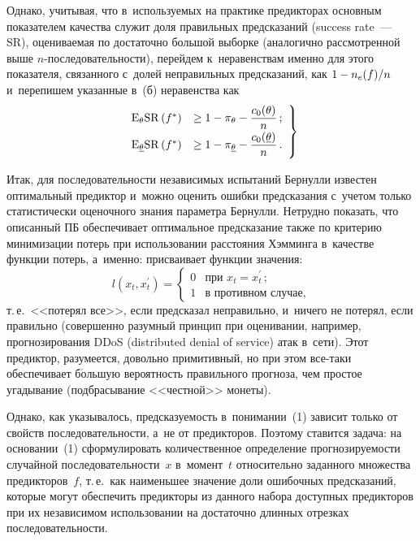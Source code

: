 \begin{multicols}{2}
  Однако, учитывая, что в~используемых на практике предикторах 
основным показателем качества служит доля правильных предсказаний 
(success rate~--- SR), оцениваемая по достаточно большой выборке 
(аналогично рассмотренной выше  
$n$-по\-сле\-до\-ва\-тель\-ности), перейдем к~неравенствам именно для этого 
показателя, связанного с~долей неправильных предсказаний, как $1\hm- 
n_e(f)/n$ и~перепишем указанные в~(б) неравенства как
  \begin{equation}
  \left.
  \begin{array}{rl}
  \mathrm{E}_\theta \mathrm{SR}\,(f^*) &\geq 1-\pi_\theta -
\displaystyle\frac{\displaystyle c_0(\theta)\mathstrut}{\displaystyle n\mathstrut}\,;\\[6pt]
  \mathrm{E}_{\underline{\theta}} \mathrm{SR}\,(f^*) &\geq 1-
\pi_{\underline{\theta}} -\displaystyle\frac{\displaystyle c_0(\underline{\theta})\mathstrut}{\displaystyle n\mathstrut}\,.
  \end{array}
  \right\}
  \label{e2-fr}
  \end{equation}
  
  Итак, для последовательности независимых испытаний Бернулли известен 
оптимальный пре\-диктор и~можно оценить ошибки предсказания с~учетом 
только статистически оценочного знания параметра Бернулли. Нетрудно 
показать, что описанный ПБ обеспечивает оптимальное предсказание также 
по критерию минимизации потерь при использовании расстояния Хэмминга 
в~качестве функции потерь, а~именно: присваивает функции значения:
$$
l(x_t,  x^\prime_t) =\begin{cases}
 0 & \mbox{при } x_t = x^\prime_t\,;\\
 1 & \mbox{в~противном\ случае},
 \end{cases}
 $$
  т.\,е.\ <<потерял все>>, если предсказал неправильно, 
и~ничего не потерял, если правильно (совершенно разумный принцип при 
оценивании, например, прогнозирования DDoS (distributed denial of service)
атак в~сети). Этот предиктор, 
разумеется, довольно примитивный, но при этом все-та\-ки обеспечивает 
б$\acute{\mbox{о}}$льшую вероятность правильного прогноза, чем простое 
угадывание (подбрасывание <<честной>> монеты).
  
  Однако, как указывалось, предсказуемость в~понимании~(1) зависит 
только от свойств последовательности, а~не от предикторов. Поэтому 
ставится задача: на основании~(1) сформулировать количественное 
определение прогнозируемости случайной последовательности~$x$ 
в~момент~$t$ относительно заданного множества предикторов~$f$, т.\,е.\ как 
наименьшее значение доли ошибочных предсказаний, которые могут 
обеспечить предикторы из данного набора доступных предикторов при их 
независимом использовании на достаточно длинных отрезках 
последовательности. 
   

\end{multicols}
